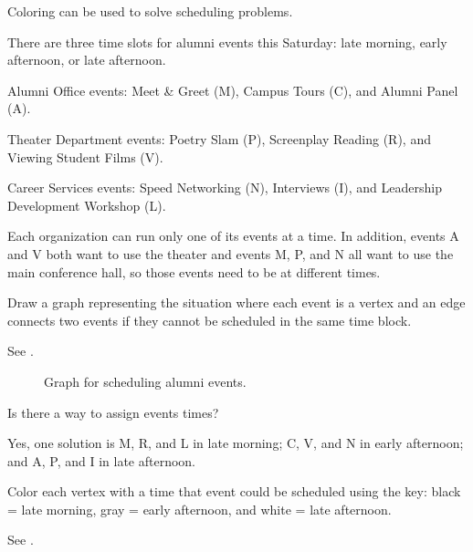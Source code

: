 Coloring can be used to solve scheduling problems.

\begin{exam}
\label{exam_scheduling_alumni}
There are three time slots for alumni events this Saturday:  late morning, early afternoon, or late afternoon. 
    \begin{bull}
        \item Alumni Office events:  Meet \& Greet (M), Campus Tours (C), and Alumni Panel (A).
        \item Theater Department events:  Poetry Slam (P), Screenplay Reading (R), and Viewing Student Films (V).
        \item Career Services events:  Speed Networking (N), Interviews (I), and Leadership Development Workshop (L). 
    \end{bull}
    Each organization can run only one of its events at a time.
    In addition, events A and V both want to use the theater and events M, P, and N all want to use the main conference hall, so those events need to be at different times. 
    \begin{apart}
        \item Draw a graph representing the situation where each event is a vertex and an edge connects two events if they cannot be scheduled in the same time block.
            \begin{soln}
                See .
                \begin{figure}
                    \centering                    
                    
                    \caption{Graph for scheduling alumni events.}
                    \label{fig_schedule_alumni}
                \end{figure}
            \end{soln}

        \item \label{part_schedule_events} Is there a way to assign events times?  
            \begin{soln}
                Yes, one solution is M, R, and L in late morning; C, V, and N in early afternoon; and A, P, and I in late afternoon. 
            \end{soln}
        \item Color each vertex with a time that event could be scheduled using the key: black = late morning, gray = early afternoon, and white = late afternoon. 
            \begin{soln}
                See .


\end{soln}
\end{apart}
\end{exam}
